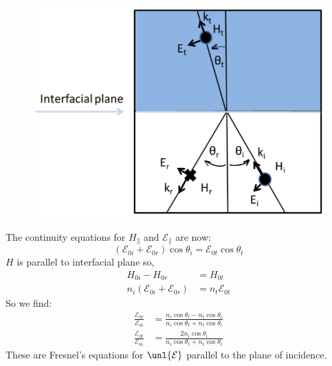 \documentclass[a4paper, 11pt, normalem]{report}
\newcommand\E{\mathcal{E}}
\newcommand\uE{\unl{\E}}
\begin{document}
\begin{figure}[H]
	\centering
	\includegraphics[scale=0.4]{parfres.png}
\end{figure}

The continuity equations for $H_{\parallel}$ and $\E_{\parallel}$ are now:
\begin{equation}
	(\E_{0i} + \E_{0r})\cos\theta_i = \E_{0t}\cos\theta_t
\end{equation}
$H$ is parallel to interfacial plane so,
\begin{align}
	H_{0i} - H_{0r} &= H_{0t} \\
	n_i(\E_{0i} + \E_{0r}) &= n_t\E_{0t}
\end{align}
So we find:
\begin{align}
	\frac{\E_{0r}}{\E_{0i}} &= \frac{n_i\cos\theta_t - n_t\cos\theta_i}{n_i\cos\theta_t + n_t\cos\theta_i} \\
	\frac{\E_{0t}}{\E_{0i}} &= \frac{2n_i\cos\theta_i}{n_i\cos\theta_t + n_t\cos\theta_t}
\end{align}
These are Fresnel's equations for $\uE$ parallel to the plane of incidence.
\end{document}
